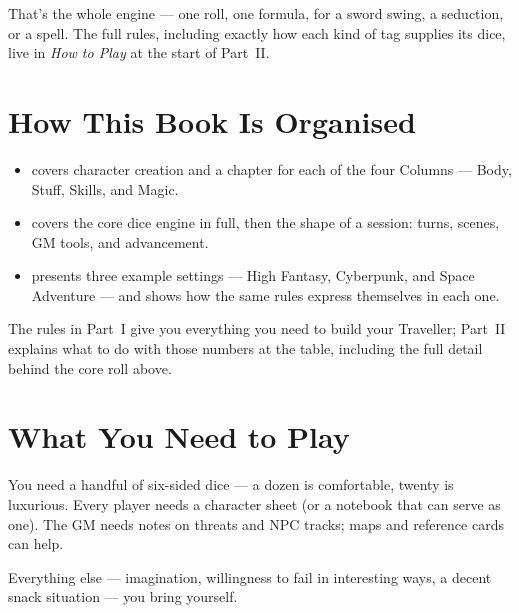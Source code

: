 That's the whole engine --- one roll, one formula, for a sword swing, a
seduction, or a spell. The full rules, including exactly how each kind of
tag supplies its dice, live in \emph{How to Play} at the start of
Part~II.

\section{How This Book Is Organised}

\begin{itemize}
  \item {} covers character
        creation and a chapter for each of the four Columns ---
        Body, Stuff, Skills, and Magic.
  \item {} covers the core dice
        engine in full, then the shape of a session: turns, scenes,
        GM tools, and advancement.
  \item {} presents three example
        settings --- High Fantasy, Cyberpunk, and Space Adventure
        --- and shows how the same rules express themselves in
        each one.
\end{itemize}

The rules in Part~I give you everything you need to build your
Traveller; Part~II explains what to do with those numbers at the table,
including the full detail behind the core roll above.

\section{What You Need to Play}

You need a handful of six-sided dice --- a dozen is comfortable,
twenty is luxurious. Every player needs a character sheet (or a
notebook that can serve as one). The GM needs notes on threats and
NPC tracks; maps and reference cards can help.

Everything else --- imagination, willingness to fail in interesting
ways, a decent snack situation --- you bring yourself.
